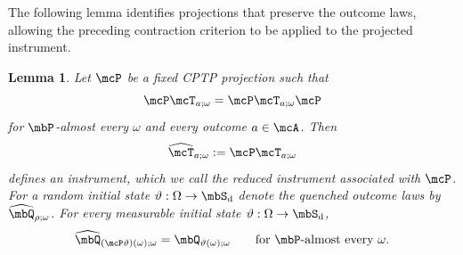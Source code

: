 \documentclass[a4paper]{article}
\numberwithin{equation}{section}   %
\theoremstyle{plain}   %
\theoremstyle{plain}   %
\newtheorem{lemma}{Lemma}[section]   %
\theoremstyle{examplestyle}
\DeclareMathOperator{\states}{\mbS_d}   %
\DeclareMathOperator{\pr}{\mbP}           %
\begin{document}
The following lemma identifies projections that preserve the outcome laws, allowing the preceding contraction criterion to be applied to the projected instrument.

\begin{lemma}
\label{lem:unified:reduction}
    Let $\mcP$ be a fixed CPTP projection such that
    \begin{equation}
    \label{eq:unified:reduction}
         \mcP\mcT_{a;\omega}
         =\mcP\mcT_{a;\omega}\mcP
    \end{equation}
    for $\pr$-almost every $\omega$ and every outcome $a\in\mcA$.
    Then
    \[
        \widehat{\mcT}_{a;\omega}
        :=\mcP\mcT_{a;\omega}
    \]
    defines an instrument,  which we call the \emph{reduced instrument} associated with $\mcP$.
    For a random initial state $\vartheta:\Omega\to \states$ denote the quenched outcome laws by $\widehat{\mbQ}_{\rho;\omega}$.
    For every measurable initial state $\vartheta:\Omega\to\states$, 
    \begin{equation}
    \label{eq:unified:reduced-law}
         \widehat{\mbQ}_{(\mcP\vartheta)(\omega);\omega}
         =
         \mbQ_{\vartheta(\omega);\omega}
         \qquad\text{for $\pr$-almost every $\omega$.}
    \end{equation}
\end{lemma}
\end{document}
